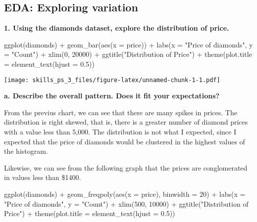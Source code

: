 \documentclass[
]{article}
\newenvironment{Shaded}{\begin{snugshade}}{\end{snugshade}}
\newcommand{\AttributeTok}[1]{\textcolor[rgb]{0.77,0.63,0.00}{#1}}
\newcommand{\DecValTok}[1]{\textcolor[rgb]{0.00,0.00,0.81}{#1}}
\newcommand{\FloatTok}[1]{\textcolor[rgb]{0.00,0.00,0.81}{#1}}
\newcommand{\FunctionTok}[1]{\textcolor[rgb]{0.00,0.00,0.00}{#1}}
\newcommand{\NormalTok}[1]{#1}
\newcommand{\SpecialCharTok}[1]{\textcolor[rgb]{0.00,0.00,0.00}{#1}}
\newcommand{\StringTok}[1]{\textcolor[rgb]{0.31,0.60,0.02}{#1}}
\begin{document}
\hypertarget{eda-exploring-variation}{%
\subsection{EDA: Exploring variation}\label{eda-exploring-variation}}

\textbf{1. Using the diamonds dataset, explore the distribution of
price.}

\begin{Shaded}
\begin{Highlighting}[]
\FunctionTok{ggplot}\NormalTok{(diamonds) }\SpecialCharTok{+} 
  \FunctionTok{geom\_bar}\NormalTok{(}\FunctionTok{aes}\NormalTok{(}\AttributeTok{x =}\NormalTok{ price)) }\SpecialCharTok{+}
  \FunctionTok{labs}\NormalTok{(}\AttributeTok{x =} \StringTok{"Price of diamonds"}\NormalTok{, }\AttributeTok{y =} \StringTok{"Count"}\NormalTok{) }\SpecialCharTok{+}
  \FunctionTok{xlim}\NormalTok{(}\DecValTok{0}\NormalTok{, }\DecValTok{20000}\NormalTok{) }\SpecialCharTok{+}
  \FunctionTok{ggtitle}\NormalTok{(}\StringTok{"Distribution of Price"}\NormalTok{) }\SpecialCharTok{+}
  \FunctionTok{theme}\NormalTok{(}\AttributeTok{plot.title =} \FunctionTok{element\_text}\NormalTok{(}\AttributeTok{hjust =} \FloatTok{0.5}\NormalTok{))}
\end{Highlighting}
\end{Shaded}

\texttt{[image: skills\_ps\_3\_files/figure-latex/unnamed-chunk-1-1.pdf]}

\textbf{a. Describe the overall pattern. Does it fit your expectations?}

From the previus chart, we can see that there are many spikes in prices.
The distribution is right skewed, that is, there is a greater number of
diamond prices with a value less than 5,000. The distribution is not
what I expected, since I expected that the price of diamonds would be
clustered in the highest values of the histogram.

Likewise, we can see from the following graph that the prices are
conglomerated in values less than \$1400.

\begin{Shaded}
\begin{Highlighting}[]
\FunctionTok{ggplot}\NormalTok{(diamonds) }\SpecialCharTok{+} 
  \FunctionTok{geom\_freqpoly}\NormalTok{(}\FunctionTok{aes}\NormalTok{(}\AttributeTok{x =}\NormalTok{ price), }\AttributeTok{binwidth =} \DecValTok{20}\NormalTok{) }\SpecialCharTok{+}
  \FunctionTok{labs}\NormalTok{(}\AttributeTok{x =} \StringTok{"Price of diamonds"}\NormalTok{, }\AttributeTok{y =} \StringTok{"Count"}\NormalTok{) }\SpecialCharTok{+}
  \FunctionTok{xlim}\NormalTok{(}\DecValTok{500}\NormalTok{, }\DecValTok{10000}\NormalTok{) }\SpecialCharTok{+}
  \FunctionTok{ggtitle}\NormalTok{(}\StringTok{"Distribution of Price"}\NormalTok{) }\SpecialCharTok{+}
  \FunctionTok{theme}\NormalTok{(}\AttributeTok{plot.title =} \FunctionTok{element\_text}\NormalTok{(}\AttributeTok{hjust =} \FloatTok{0.5}\NormalTok{))}
\end{Highlighting}
\end{Shaded}
\end{document}
